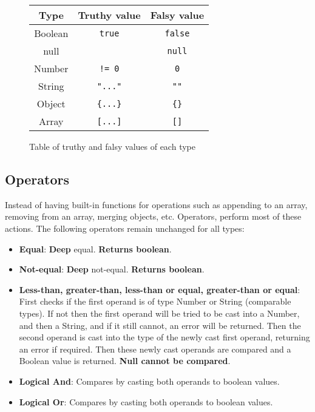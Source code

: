 \begin{figure}[H]
    \begin{center}
        \begin{tabular}{| c | c | c |}
            \hline
            Type & Truthy value & Falsy value\\
            \hline
            Boolean & \verb|true| & \verb|false|\\
            \hline
            null & & \verb|null|\\
            \hline
            Number & \verb|!= 0| & \verb|0|\\
            \hline
            String & \verb|"..."| & \verb|""|\\
            \hline
            Object & \verb|{...}| & \verb|{}|\\
            \hline
            Array & \verb|[...]| & \verb|[]|\\
            \hline
        \end{tabular}
    \end{center}
    \caption{Table of truthy and falsy values of each type}
\end{figure}

\subsection{Operators}
\label{sec:operatorvaluerel}

Instead of having built-in functions for operations such as appending to an array, removing from an array, merging objects, etc. Operators, perform most of these actions. The following operators remain unchanged for all types:

\begin{itemize}
    \item \textbf{Equal}: \textbf{Deep} equal. \textbf{Returns boolean}.
    \item \textbf{Not-equal}: \textbf{Deep} not-equal. \textbf{Returns boolean}.
    \item \textbf{Less-than, greater-than, less-than or equal, greater-than or equal}: First checks if the first operand is of type Number or String (comparable types). If not then the first operand will be tried to be cast into a Number, and then a String, and if it still cannot, an error will be returned. Then the second operand is cast into the type of the newly cast first operand, returning an error if required. Then these newly cast operands are compared and a Boolean value is returned. \textbf{Null cannot be compared}.
    \item \textbf{Logical And}: Compares by casting both operands to boolean values.
    \item \textbf{Logical Or}: Compares by casting both operands to boolean values.
\end{itemize}

